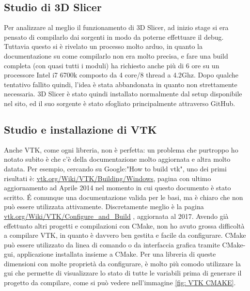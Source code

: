 \subsection{Studio di 3D Slicer}
Per analizzare al meglio il funzionamento di 3D Slicer, ad inizio stage si era pensato di compilarlo dai sorgenti in modo da poterne effettuare il debug. Tuttavia questo si è rivelato un processo molto arduo, in quanto la documentazione su come compilarlo non era molto precisa, e fare una build completa (con quasi tutti i moduli) ha richiesto anche più di 6 ore su un processore Intel i7 6700k composto da 4 core/8 thread a 4.2Ghz. Dopo qualche tentativo fallito quindi, l'idea è stata abbandonata in quanto non strettamente necessaria. 3D Slicer è stato quindi installato normalmente dal setup disponibile nel sito, ed il suo sorgente è stato sfogliato principalmente attraverso GitHub.

\subsection{Studio e installazione di VTK}
Anche VTK, come ogni libreria, non è perfetta: un problema che purtroppo ho notato subito è che c'è della documentazione molto aggiornata e altra molto datata. Per esempio, cercando su Google:"How to build vtk", uno dei primi risultati è: \href{https://vtk.org/Wiki/VTK/Building/Windows}{vtk.org/Wiki/VTK/Building/Windows}, pagina con ultimo aggiornamento ad Aprile 2014 nel momento in cui questo documento è stato scritto. \'E comunque una documentazione valida per le basi, ma è chiaro che non può essere utilizzata attivamente. Discretamente meglio è la pagina \href{https://vtk.org/Wiki/VTK/Configure_and_Build}{vtk.org/Wiki/VTK/Configure\_and\_Build} , aggiornata al 2017. Avendo già effettuato altri progetti e compilazioni con CMake, non ho avuto grossa difficoltà a compilare VTK, in quanto è davvero ben gestita e facile da configurare. CMake può essere utilizzato da linea di comando o da interfaccia grafica tramite CMake-gui, applicazione installata insieme a CMake. Per una libreria di queste dimensioni con molte proprietà da configurare, è molto più comodo utilizzare la gui che permette di visualizzare lo stato di tutte le variabili prima di generare il progetto da compilare, come si può vedere nell'immagine \ref{fig: VTK CMAKE}.

